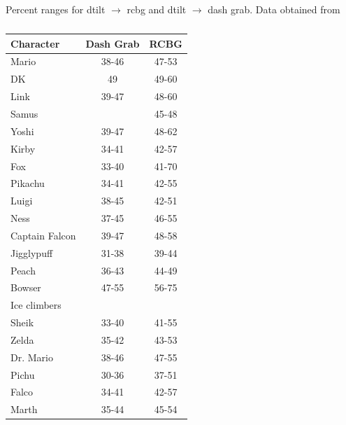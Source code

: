 \begin{table}[h]
    \centering
    \caption{Percent ranges for dtilt $\rightarrow$ rcbg and dtilt $\rightarrow$ dash grab. Data obtained from\cite{ref:jason:rcbg-ranges}}
    \begin{subtable}[t]{.45\linewidth}
        \centering
        \caption{}
        \begin{threeparttable}
        \begin{tabular}{lcc}
            \toprule
            \textbf{Character} & \textbf{Dash Grab} & \textbf{RCBG} \\
            \midrule
            Mario             & 38-46          & 47-53 \\
            DK                & 49             & 49-60 \\
            Link              & 39-47          & 48-60 \\
            Samus             &                & 45-48 \\
            Yoshi             & 39-47          & 48-62 \\
            Kirby             & 34-41\tnote{1} & 42-57 \\
            Fox               & 33-40\tnote{1} & 41-70 \\
            Pikachu           & 34-41\tnote{1} & 42-55 \\
            Luigi             & 38-45\tnote{2} & 42-51\tnote{3} \\
            Ness              & 37-45          & 46-55 \\
            Captain Falcon    & 39-47          & 48-58 \\
            Jigglypuff        & 31-38\tnote{1} & 39-44 \\
            Peach             & 36-43\tnote{1} & 44-49 \\
            Bowser            & 47-55          & 56-75 \\
            Ice climbers      &                &       \\
            Sheik             & 33-40\tnote{1} & 41-55 \\
            Zelda             & 35-42          & 43-53 \\
            Dr. Mario         & 38-46\tnote{1} & 47-55 \\
            Pichu             & 30-36\tnote{1} & 37-51 \\
            Falco             & 34-41\tnote{1} & 42-57 \\
            Marth             & 35-44          & 45-54 \\

\end{tabular}
\end{threeparttable}
\end{subtable}
\end{table}
